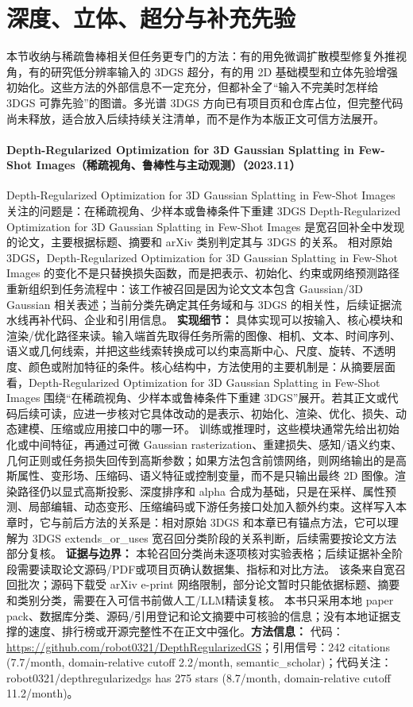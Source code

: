 \section{深度、立体、超分与补充先验}

本节收纳与稀疏鲁棒相关但任务更专门的方法：有的用免微调扩散模型修复外推视角，有的研究低分辨率输入的 3DGS 超分，有的用 2D 基础模型和立体先验增强初始化。这些方法的外部信息不一定充分，但都补全了“输入不完美时怎样给 3DGS 可靠先验”的图谱。多光谱 3DGS 方向已有项目页和仓库占位，但完整代码尚未释放，适合放入后续持续关注清单，而不是作为本版正文可信方法展开。
\paragraph{Depth-Regularized Optimization for 3D Gaussian Splatting in Few-Shot Images（稀疏视角、鲁棒性与主动观测）（2023.11）}
Depth-Regularized Optimization for 3D Gaussian Splatting in Few-Shot Images~\cite{2311_13398} 关注的问题是：在稀疏视角、少样本或鲁棒条件下重建 3DGS Depth-Regularized Optimization for 3D Gaussian Splatting in Few-Shot Images 是宽召回补全中发现的论文，主要根据标题、摘要和 arXiv 类别判定其与 3DGS 的关系。
相对原始 3DGS，Depth-Regularized Optimization for 3D Gaussian Splatting in Few-Shot Images 的变化不是只替换损失函数，而是把表示、初始化、约束或网络预测路径重新组织到任务流程中：该工作被召回是因为论文文本包含 Gaussian/3D Gaussian 相关表述；当前分类先确定其任务域和与 3DGS 的相关性，后续证据流水线再补代码、企业和引用信息。
\textbf{实现细节：} 具体实现可以按输入、核心模块和渲染/优化路径来读。输入端首先取得任务所需的图像、相机、文本、时间序列、语义或几何线索，并把这些线索转换成可以约束高斯中心、尺度、旋转、不透明度、颜色或附加特征的条件。核心结构中，方法使用的主要机制是：从摘要层面看，Depth-Regularized Optimization for 3D Gaussian Splatting in Few-Shot Images 围绕“在稀疏视角、少样本或鲁棒条件下重建 3DGS”展开。若其正文或代码后续可读，应进一步核对它具体改动的是表示、初始化、渲染、优化、损失、动态建模、压缩或应用接口中的哪一环。 训练或推理时，这些模块通常先给出初始化或中间特征，再通过可微 Gaussian rasterization、重建损失、感知/语义约束、几何正则或任务损失回传到高斯参数；如果方法包含前馈网络，则网络输出的是高斯属性、变形场、压缩码、语义特征或控制变量，而不是只输出最终 2D 图像。渲染路径仍以显式高斯投影、深度排序和 alpha 合成为基础，只是在采样、属性预测、局部编辑、动态变形、压缩编码或下游任务接口处加入额外约束。这样写入本章时，它与前后方法的关系是：相对原始 3DGS 和本章已有锚点方法，它可以理解为 3DGS extends\_or\_uses 宽召回分类阶段的关系判断，后续需要按论文方法部分复核。
\textbf{证据与边界：} 本轮召回分类尚未逐项核对实验表格；后续证据补全阶段需要读取论文源码/PDF或项目页确认数据集、指标和对比方法。 该条来自宽召回批次；源码下载受 arXiv e-print 网络限制，部分论文暂时只能依据标题、摘要和类别分类，需要在入可信书前做人工/LLM精读复核。 本书只采用本地 paper pack、数据库分类、源码/引用登记和论文摘要中可核验的信息；没有本地证据支撑的速度、排行榜或开源完整性不在正文中强化。\textbf{方法信息：} 代码：\url{https://github.com/robot0321/DepthRegularizedGS}；引用信号：242 citations (7.7/month, domain-relative cutoff 2.2/month, semantic\_scholar)；代码关注：robot0321/depthregularizedgs has 275 stars (8.7/month, domain-relative cutoff 11.2/month)。

